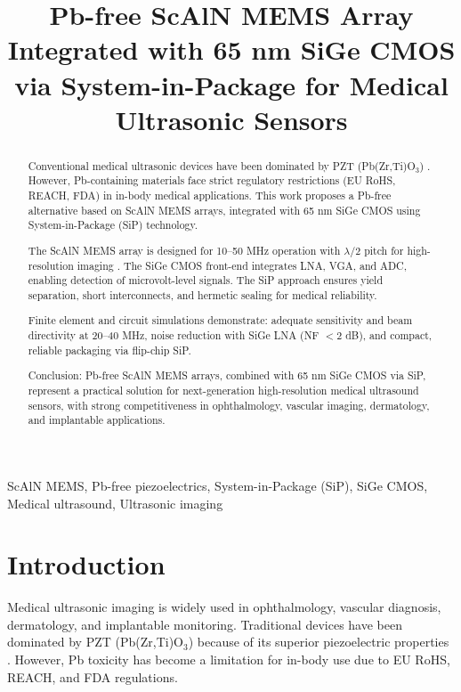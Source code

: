 \documentclass[conference]{IEEEtran}
\begin{document}
\title{Pb-free ScAlN MEMS Array Integrated with 65 nm SiGe CMOS via System-in-Package for Medical Ultrasonic Sensors}

\author{
}

\maketitle

\begin{abstract}
Conventional medical ultrasonic devices have been dominated by PZT (Pb(Zr,Ti)O$_3$) \cite{akata2009pzt}. 
However, Pb-containing materials face strict regulatory restrictions (EU RoHS, REACH, FDA) in in-body medical applications. 
This work proposes a Pb-free alternative based on ScAlN MEMS arrays, integrated with 65 nm SiGe CMOS using System-in-Package (SiP) technology.

The ScAlN MEMS array is designed for 10--50 MHz operation with $\lambda/2$ pitch for high-resolution imaging \cite{akrout2018scaln}. 
The SiGe CMOS front-end integrates LNA, VGA, and ADC, enabling detection of microvolt-level signals. 
The SiP approach ensures yield separation, short interconnects, and hermetic sealing for medical reliability.

Finite element and circuit simulations demonstrate: adequate sensitivity and beam directivity at 20--40 MHz, 
noise reduction with SiGe LNA (NF $< 2$ dB), and compact, reliable packaging via flip-chip SiP.

Conclusion: Pb-free ScAlN MEMS arrays, combined with 65 nm SiGe CMOS via SiP, represent a practical solution for next-generation 
high-resolution medical ultrasound sensors, with strong competitiveness in ophthalmology, vascular imaging, dermatology, and implantable applications.
\end{abstract}

\begin{IEEEkeywords}
ScAlN MEMS, Pb-free piezoelectrics, System-in-Package (SiP), SiGe CMOS, Medical ultrasound, Ultrasonic imaging
\end{IEEEkeywords}

\section{Introduction}
Medical ultrasonic imaging is widely used in ophthalmology, vascular diagnosis, dermatology, and implantable monitoring. 
Traditional devices have been dominated by PZT (Pb(Zr,Ti)O$_3$) because of its superior piezoelectric properties \cite{akata2009pzt}. 
However, Pb toxicity has become a limitation for in-body use due to EU RoHS, REACH, and FDA regulations.
\end{document}
